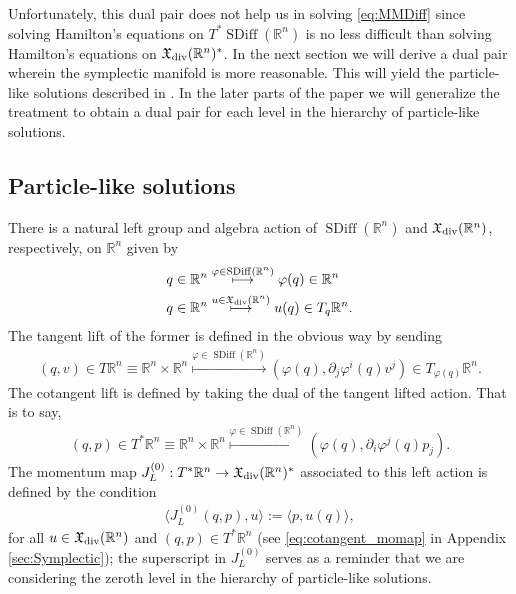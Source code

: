 \documentclass[12pt]{amsart}
\newcommand{\R}{\ensuremath{\mathbb{R}}}
\DeclareMathOperator{\SDiff}{SDiff}
\begin{document}
Unfortunately, this dual pair does not help us in solving \eqref{eq:MMDiff}
since solving Hamilton's equations on $T^*\SDiff(\R^n)$ is no less difficult
than solving Hamilton's equations on $\mathfrak{X}_{\rm div}(\R^n)^*$.
In the next section we will derive a dual pair wherein the symplectic
manifold is more reasonable.
This will yield the particle-like solutions described in \cite{MumfordMichor2013}. In the later parts of the paper we will generalize the treatment to obtain a  dual pair for each level in the hierarchy of particle-like solutions.

\subsection{Particle-like solutions}
\label{sec:Momentum maps}
There is a natural left group and algebra action of $\SDiff(\R^n)$
and $\mathfrak{X}_{\rm div}(\R^n)$, respectively, on $\R^n$ given by
\begin{align*}
  q \in \R^n
  &\stackrel{ \varphi \in \SDiff(\R^n) }{\longmapsto}
  \varphi(q) \in \R^n \\
  q \in \R^n
  &\stackrel{ u \in \mathfrak{X}_{\rm div}(\R^n) }{\longmapsto}
  u(q) \in T_q\R^n.
\end{align*}
The tangent lift of the former is defined in the obvious way by sending
\begin{align*}
  (q,v) \in T\R^n \equiv \R^n \times \R^n
  \stackrel{ \varphi \in \SDiff(\R^n) }{\longmapsto}
  (\varphi(q) , \partial_j\varphi^i(q) v^j ) \in T_{\varphi(q)} \R^n.
\end{align*}
The cotangent lift is defined by taking the dual
of  the tangent lifted action.
That is to say,
\begin{align*}
  (q, p) \in T^*\R^n \equiv \R^n \times \R^n
  \stackrel{ \varphi \in \SDiff(\R^n) }{\longmapsto}
  (\varphi(q) , \partial_i\varphi^j(q) p_j ).
\end{align*}
The momentum map 
$J^{(0)}_L : T^*\R^n \to \mathfrak{X}_{\rm div}(\R^n)^*$
associated to this left action is defined by the
condition
\begin{align*}
  \langle J_L^{(0)}( q , p) , u \rangle := \langle p , u(q) \rangle,
\end{align*}
for all $u \in \mathfrak{X}_{\rm div}(\R^n)$ and $(q,p) \in T^*\R^n$ (see \eqref{eq:cotangent_momap} in Appendix \ref{sec:Symplectic}); the superscript in $J_L^{(0)}$ serves as a reminder that we are considering the zeroth level in the hierarchy of particle-like solutions.
\end{document}
